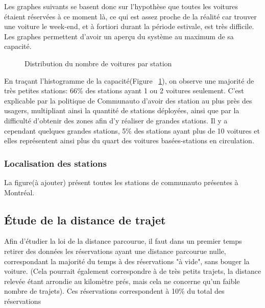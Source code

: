 \documentclass[12pt,a4paper]{article}
\newcommand{\1}[1]{\mathbbm{1}_{\{#1\}} }
\theoremstyle{definition}
\begin{document}
{Les graphes suivants se basent donc sur l'hypothèse que toutes les voitures étaient réservées à ce moment là, ce qui est assez proche de la réalité car trouver une voiture le week-end, et à fortiori durant la période estivale, est très difficile.
Les graphes permettent d'avoir un aperçu du système au maximum de sa capacité.


\begin{figure}[!h]
\centering
{}
\caption{Distribution du nombre de voitures par station}
\label{hist_capa}
\end{figure}


En traçant l'histogramme de la capacité(Figure~ \ref{hist_capa}), on observe une majorité de très petites stations: 66\% des stations ayant 1 ou 2 voitures seulement. C'est explicable par la politique de Communauto d'avoir des station au plus près des usagers, multipliant ainsi la quantité de stations déployées, ainsi que par la difficulté d'obtenir des zones afin d'y réaliser de grandes stations.
Il y a cependant quelques grandes stations, 5\% des stations ayant plus de 10 voitures et elles représentent ainsi plus du quart des voitures basées-stations en circulation.

\subsubsection{Localisation des stations}

La figure(à ajouter) présent toutes les stations de communauto présentes à Montréal.

\subsection{Étude de la distance de trajet}


Afin d'étudier la loi de la distance parcourue, il faut dans un premier temps retirer des données les réservations ayant une distance parcourue nulle, correspondant la majorité du temps à des réservations "à vide", sans bouger la voiture. (Cela pourrait également correspondre à de très petits trajets, la distance relevée étant arrondie au kilomètre prés, mais cela ne concerne qu'un faible nombre de trajets). Ces réservations correspondent à 10\% du total des réservations

}
\end{document}
